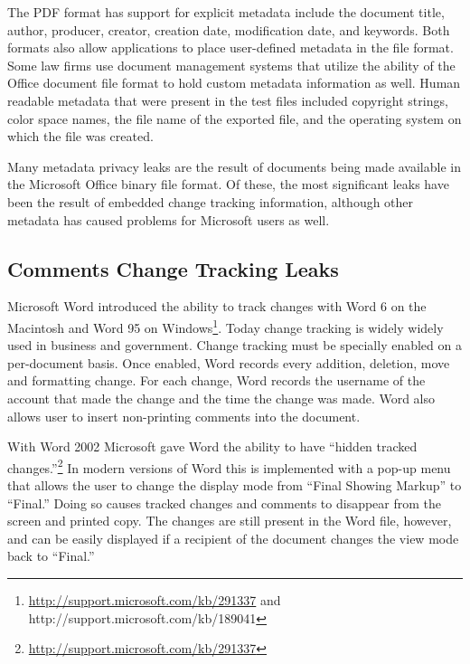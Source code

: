 The PDF format has support for explicit metadata include the document
title, author, producer, creator, creation date, modification date,
and keywords. Both formats also allow applications to place
user-defined metadata in the file format. Some law firms use document
management systems that utilize the ability of the Office document
file format to hold custom metadata information as well. Human
readable metadata that were present in the test files included
copyright strings, color space names, the file name of the exported
file, and the operating system on which the file was created.

Many metadata privacy leaks are the result of
documents being made available in the  Microsoft Office binary file
format. Of these, the most significant leaks have been the result of
embedded change tracking information, although other metadata has
caused problems for Microsoft users as well.


\subsection{Comments Change Tracking Leaks}

Microsoft Word introduced the ability to track changes with Word 6 on
the Macintosh and Word 95 on
Windows\footnote{\url{http://support.microsoft.com/kb/291337}
  and http://support.microsoft.com/kb/189041}. Today change
tracking is widely widely used in business and government. Change
tracking must be specially enabled on a per-document basis. Once
enabled, Word records every addition, deletion, move and formatting
change. For each change, Word records the username of the account that
made the change and the time the change was made. Word also allows
user to insert non-printing comments into the document.

With Word 2002 Microsoft gave Word the ability to have ``hidden
tracked
changes.''\footnote{\url{http://support.microsoft.com/kb/291337}} In
modern versions of Word this is implemented with a pop-up menu that
allows the user to change the display mode from ``Final Showing
Markup'' to ``Final.'' Doing so causes tracked changes and comments to
disappear from the screen and printed copy. The changes are still
present in the Word file, however, and can be easily displayed if a
recipient of the document  changes the view mode back to ``Final.''

